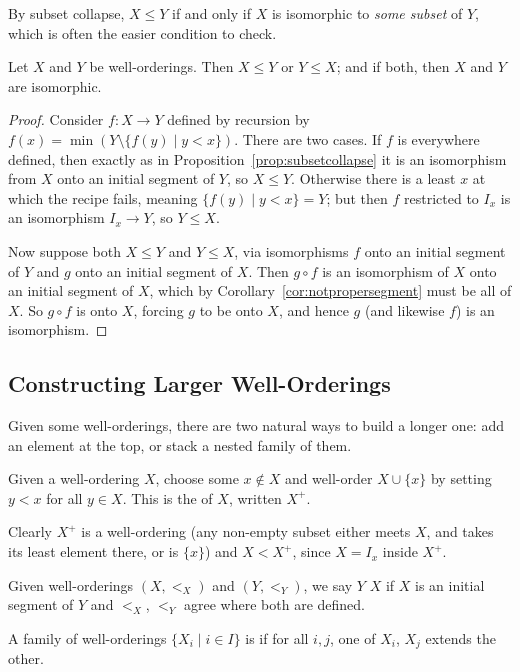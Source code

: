 By subset collapse, $X \leq Y$ if and only if $X$ is isomorphic to \emph{some subset} of $Y$, which is often the easier condition to check.

\begin{proposition}\label{prop:wotrichotomy}
  Let $X$ and $Y$ be well-orderings. Then $X \leq Y$ or $Y \leq X$; and if both, then $X$ and $Y$ are isomorphic.
\end{proposition}
\begin{proof}
  Consider $f: X \rightarrow Y$ defined by recursion by $f(x) = \min (Y \setminus \{f(y) \mid y < x\})$. There are two cases. If $f$ is everywhere defined, then exactly as in Proposition~\ref{prop:subsetcollapse} it is an isomorphism from $X$ onto an initial segment of $Y$, so $X \leq Y$. Otherwise there is a least $x$ at which the recipe fails, meaning $\{f(y) \mid y < x\} = Y$; but then $f$ restricted to $I_x$ is an isomorphism $I_x \to Y$, so $Y \leq X$.

  Now suppose both $X \leq Y$ and $Y \leq X$, via isomorphisms $f$ onto an initial segment of $Y$ and $g$ onto an initial segment of $X$. Then $g \circ f$ is an isomorphism of $X$ onto an initial segment of $X$, which by Corollary~\ref{cor:notpropersegment} must be all of $X$. So $g \circ f$ is onto $X$, forcing $g$ to be onto $X$, and hence $g$ (and likewise $f$) is an isomorphism.
\end{proof}

\subsection{Constructing Larger Well-Orderings}

Given some well-orderings, there are two natural ways to build a longer one: add an element at the top, or stack a nested family of them.

\begin{definition}[Successor]
  Given a well-ordering $X$, choose some $x \notin X$ and well-order $X \cup \{x\}$ by setting $y < x$ for all $y \in X$. This is the  of $X$, written $X^+$.
\end{definition}

Clearly $X^+$ is a well-ordering (any non-empty subset either meets $X$, and takes its least element there, or is $\{x\}$) and $X < X^+$, since $X = I_x$ inside $X^+$.

\begin{definition}
  Given well-orderings $(X, <_X)$ and $(Y, <_Y)$, we say $Y$  $X$ if $X$ is an initial segment of $Y$ and $<_X$, $<_Y$ agree where both are defined.

  A family of well-orderings $\{X_i \mid i \in I\}$ is  if for all $i, j$, one of $X_i$, $X_j$ extends the other.
\end{definition}

